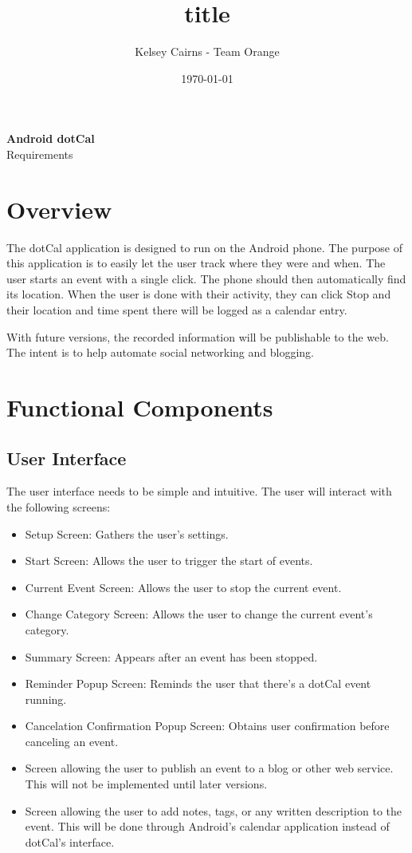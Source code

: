 \documentclass[11pt]{article}
\title{title}
\author{Kelsey Cairns - Team Orange}
\date{\today} %
\newcommand{\bt}[1]{{\sc #1}}
\begin{document}
\begin{centering}
\textbf{\huge{Android dotCal}}\\
\LARGE{Requirements}

\end{centering}

\tableofcontents

\section{Overview}

The dotCal application is designed to run on the Android phone. The purpose of this application is to easily let the user track where they were and when. The user starts an event with a single click. The phone should then automatically find its location. When the user is done with their activity, they can click \bt{Stop} and their location and time spent there will be logged as a calendar entry.

With future versions, the recorded information will be publishable to the web. The intent is to help automate social networking and blogging.

\section{Functional Components}

\subsection{User Interface}

The user interface needs to be simple and intuitive. The user will interact with the following screens:

\begin{itemize}
	\item{Setup Screen: Gathers the user's settings.}
	\item{Start Screen: Allows the user to trigger the start of events.}
	\item{Current Event Screen: Allows the user to stop the current event.}
	\item{Change Category Screen: Allows the user to change the current event's category.}
	\item{Summary Screen: Appears after an event has been stopped.}
	\item{Reminder Popup Screen: Reminds the user that there's a dotCal event running.}
	\item{Cancelation Confirmation Popup Screen: Obtains user confirmation before canceling an event.}
	\item{Screen allowing the user to publish an event to a blog or other web service. This will not be implemented until later versions.}
	\item{Screen allowing the user to add notes, tags, or any written description to the event. This will be done through Android's calendar application instead of dotCal's interface.}
\end{itemize}
\end{document}
